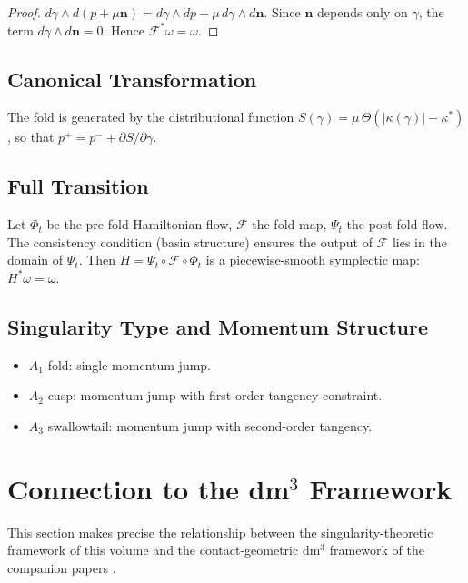 \documentclass[12pt,a4paper]{article}
\begin{document}
\begin{proof}
$d\gamma \wedge d(p + \mu\mathbf{n}) = d\gamma \wedge dp +
\mu\,d\gamma \wedge d\mathbf{n}$.
Since $\mathbf{n}$ depends only on $\gamma$, the term
$d\gamma \wedge d\mathbf{n} = 0$.
Hence $\mathcal{F}^*\omega = \omega$.
\end{proof}

\subsection{Canonical Transformation}

The fold is generated by the distributional function
$S(\gamma) = \mu\,\Theta(|\kappa(\gamma)| - \kappa^*)$,
so that $p^+ = p^- + \partial S/\partial\gamma$.

\subsection{Full Transition}

Let $\Phi_t$ be the pre-fold Hamiltonian flow, $\mathcal{F}$ the fold
map, $\Psi_t$ the post-fold flow.
The consistency condition (basin structure) ensures the output of
$\mathcal{F}$ lies in the domain of $\Psi_t$.
Then $H = \Psi_t \circ \mathcal{F} \circ \Phi_t$ is a
piecewise-smooth symplectic map: $H^*\omega = \omega$.

\subsection{Singularity Type and Momentum Structure}

\begin{itemize}[leftmargin=2em]
  \item $A_1$ fold: single momentum jump.
  \item $A_2$ cusp: momentum jump with first-order tangency constraint.
  \item $A_3$ swallowtail: momentum jump with second-order tangency.
\end{itemize}

\section{Connection to the dm$^3$ Framework}
\label{sec:gcm}

This section makes precise the relationship between the
singularity-theoretic framework of this volume and the
contact-geometric dm$^3$ framework of the companion papers
\cite{Grossi2026_SIAM, Grossi2026_ChA}.
\end{document}
